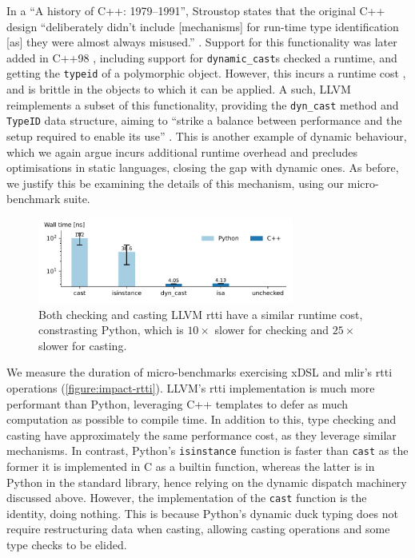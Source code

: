 In a ``A history of C++: 1979--1991'', Stroustop states that the original C++ design ``deliberately didn't include [mechanisms] for run-time type identification [as] they were almost always misused.'' \cite{stroustrupHistory197919911996}.
Support for this functionality was later added in C++98 \cite{internationalorganizationforstandardizationISOIEC148821998}, including support for \texttt{dynamic\_cast}s checked a runtime, and getting the \texttt{typeid} of a polymorphic object. However, this incurs a runtime cost \cite{goldthwaite2006technical}, and is brittle in the objects to which it can be applied. A such, LLVM reimplements a subset of this functionality, providing the \texttt{dyn\_cast} method and \texttt{TypeID} data structure, aiming to ``strike a balance between performance and the setup required to enable its use'' \cite{mlirteamMLIRCodeDocumentation}.
This is another example of dynamic behaviour, which we again argue incurs additional runtime overhead and precludes optimisations in static languages, closing the gap with dynamic ones.
As before, we justify this be examining the details of this mechanism, using our micro-benchmark suite.

\begin{figure}[H]
    \centering
    \includegraphics[width=0.75\textwidth]{images/impact_dynamism/dynamic_cast.pdf}
    \caption{Both checking and casting LLVM \ac{rtti} have a similar runtime cost, constrasting Python, which is $10\times$ slower for checking and $25\times$ slower for casting.}
    \label{figure:impact-rtti}
\end{figure}

We measure the duration of micro-benchmarks exercising xDSL and \ac{mlir}'s \ac{rtti} operations (\autoref{figure:impact-rtti}). LLVM's \ac{rtti} implementation is much more performant than Python, leveraging C++ templates to defer as much computation as possible to compile time. In addition to this, type checking and casting have approximately the same performance cost, as they leverage similar mechanisms.
In contrast, Python's \texttt{isinstance} function is faster than \texttt{cast} as the former it is implemented in C as a builtin function, whereas the latter is in Python in the standard library, hence relying on the dynamic dispatch machinery discussed above.
However, the implementation of the \texttt{cast} function is the identity, doing nothing. This is because Python's dynamic duck typing \cite{milojkovicItsDuckTyping2017} does not require restructuring data when casting, allowing casting operations and some type checks to be elided.



